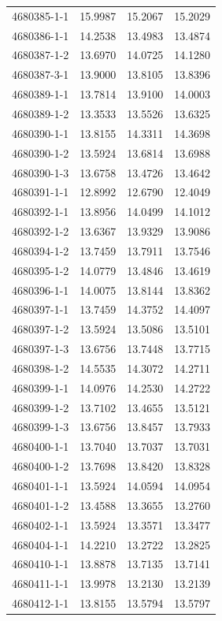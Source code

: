 \begin{longtable}{lrrr}
4680385-1-1 & 15.9987 & 15.2067 & 15.2029 \\
4680386-1-1 & 14.2538 & 13.4983 & 13.4874 \\
4680387-1-2 & 13.6970 & 14.0725 & 14.1280 \\
4680387-3-1 & 13.9000 & 13.8105 & 13.8396 \\
4680389-1-1 & 13.7814 & 13.9100 & 14.0003 \\
4680389-1-2 & 13.3533 & 13.5526 & 13.6325 \\
4680390-1-1 & 13.8155 & 14.3311 & 14.3698 \\
4680390-1-2 & 13.5924 & 13.6814 & 13.6988 \\
4680390-1-3 & 13.6758 & 13.4726 & 13.4642 \\
4680391-1-1 & 12.8992 & 12.6790 & 12.4049 \\
4680392-1-1 & 13.8956 & 14.0499 & 14.1012 \\
4680392-1-2 & 13.6367 & 13.9329 & 13.9086 \\
4680394-1-2 & 13.7459 & 13.7911 & 13.7546 \\
4680395-1-2 & 14.0779 & 13.4846 & 13.4619 \\
4680396-1-1 & 14.0075 & 13.8144 & 13.8362 \\
4680397-1-1 & 13.7459 & 14.3752 & 14.4097 \\
4680397-1-2 & 13.5924 & 13.5086 & 13.5101 \\
4680397-1-3 & 13.6756 & 13.7448 & 13.7715 \\
4680398-1-2 & 14.5535 & 14.3072 & 14.2711 \\
4680399-1-1 & 14.0976 & 14.2530 & 14.2722 \\
4680399-1-2 & 13.7102 & 13.4655 & 13.5121 \\
4680399-1-3 & 13.6756 & 13.8457 & 13.7933 \\
4680400-1-1 & 13.7040 & 13.7037 & 13.7031 \\
4680400-1-2 & 13.7698 & 13.8420 & 13.8328 \\
4680401-1-1 & 13.5924 & 14.0594 & 14.0954 \\
4680401-1-2 & 13.4588 & 13.3655 & 13.2760 \\
4680402-1-1 & 13.5924 & 13.3571 & 13.3477 \\
4680404-1-1 & 14.2210 & 13.2722 & 13.2825 \\
4680410-1-1 & 13.8878 & 13.7135 & 13.7141 \\
4680411-1-1 & 13.9978 & 13.2130 & 13.2139 \\
4680412-1-1 & 13.8155 & 13.5794 & 13.5797 \\

\end{longtable}
